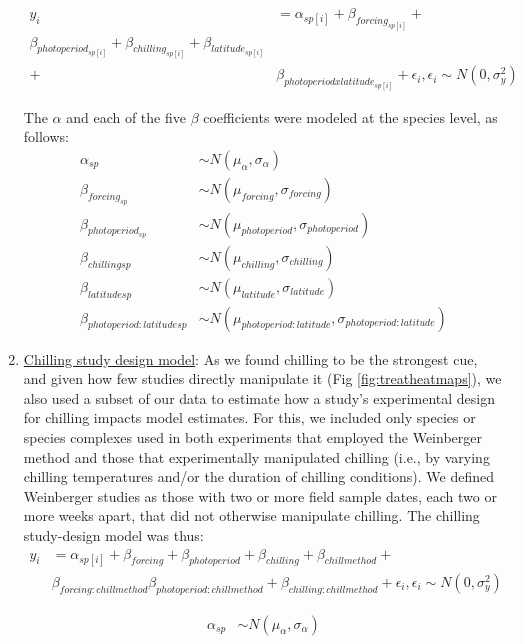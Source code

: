 \documentclass{article}
\begin{document}
\begin{enumerate}
\begin{align*}
y_i &= \alpha_{sp[i]} + \beta_{forcing_{sp[i]}} + \\
\beta_{photoperiod_{sp[i]}} + \beta_{chilling_{sp[i]}} + \beta_{latitude_{sp[i]}} \\+& \beta_{photoperiod x latitude_{sp[i]}} + \epsilon{_i},\epsilon_i \sim N(0,\sigma^2_y)
\end{align*}

\noindent The $\alpha$ and each of the five $\beta$ coefficients were modeled at the species level, as follows:
\begin{align*}
\alpha_{sp} &  \sim N(\mu_{\alpha}, \sigma_{\alpha}) \\
\beta_{forcing_{sp}} & \sim N(\mu_{forcing}, \sigma_{forcing}) \\
\beta_{photoperiod_{sp}} & \sim N(\mu_{photoperiod}, \sigma_{photoperiod})\\
\beta_{chilling{sp}} & \sim N(\mu_{chilling}, \sigma_{chilling})\\
\beta_{latitude{sp}} & \sim N(\mu_{latitude}, \sigma_{latitude})\\
\beta_{photoperiod : latitude{sp}} & \sim N(\mu_{photoperiod : latitude}, \sigma_{photoperiod : latitude})
\end{align*}


\item \underline{Chilling study design model}:
As we found chilling to be the strongest cue, and given how few studies directly manipulate it (Fig \ref{fig:treatheatmaps}), we also used a subset of our data to estimate how a study's experimental design for chilling impacts model estimates. For this, we included only species or species complexes used in both experiments that employed the Weinberger method \citep[in this method plant tissue is sequentially removed from the field and then exposed to `forcing' conditions, with the assumption that tissues collected later experience more field chilling][]{weinberger1950} and those that experimentally manipulated chilling (i.e., by varying chilling temperatures and/or the duration of chilling conditions). We defined Weinberger studies as those with two or more field sample dates, each two or more weeks apart, that did not otherwise manipulate chilling. The chilling study-design model was thus:
\begin{align*}
y_i &= \alpha_{sp[i]} + \beta_{forcing} + \beta_{photoperiod} + \beta_{chilling}+ \beta_{chillmethod} + \\ & \beta_{forcing:chillmethod} \beta_{photoperiod:chillmethod}+ \beta_{chilling:chillmethod} + \epsilon_{i}, \epsilon_{i} \sim N(0,\sigma^2_y)
\end{align*}

\begin{align*}
\alpha_{sp} & \sim N(\mu_{\alpha}, \sigma_{\alpha}) \\
\end{align*}

\end{enumerate}
\end{document}
